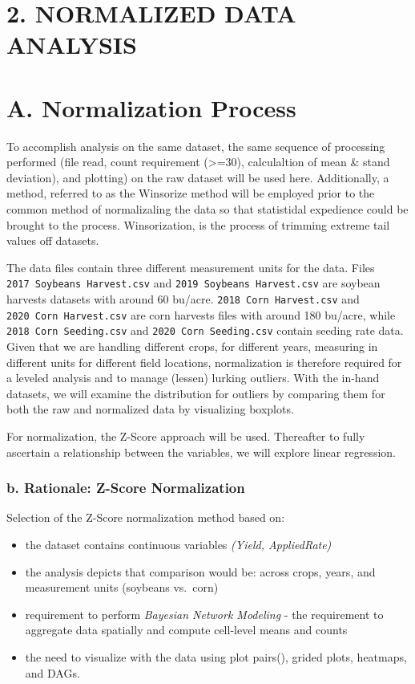 \documentclass[
]{article}
\begin{document}
\section{2. NORMALIZED DATA ANALYSIS}\label{normalized-data-analysis}

\section{A. Normalization Process}\label{a.-normalization-process}

To accomplish analysis on the same dataset, the same sequence of
processing performed (file read, count requirement (\textgreater=30),
calculaltion of mean \& stand deviation), and plotting) on the raw
dataset will be used here. Additionally, a method, referred to as the
Winsorize method will be employed prior to the common method of
normalizaling the data so that statistidal expedience could be brought
to the process. Winsorization, is the process of trimming extreme tail
values off datasets.

The data files contain three different measurement units for the data.
Files \texttt{2017\ Soybeans\ Harvest.csv} and
\texttt{2019\ Soybeans\ Harvest.csv} are soybean harvests datasets with
around 60 bu/acre. \texttt{2018\ Corn\ Harvest.csv} and
\texttt{2020\ Corn\ Harvest.csv} are corn harvests files with around 180
bu/acre, while \texttt{2018\ Corn\ Seeding.csv} and
\texttt{2020\ Corn\ Seeding.csv} contain seeding rate data. Given that
we are handling different crops, for different years, measuring in
different units for different field locations, normalization is
therefore required for a leveled analysis and to manage (lessen) lurking
outliers. With the in-hand datasets, we will examine the distribution
for outliers by comparing them for both the raw and normalized data by
visualizing boxplots.

For normalization, the Z-Score approach will be used. Thereafter to
fully ascertain a relationship between the variables, we will explore
linear regression.

\subsubsection{b. Rationale: Z-Score
Normalization}\label{b.-rationale-z-score-normalization}

Selection of the Z-Score normalization method based on:

\begin{itemize}
\item
  the dataset contains continuous variables \emph{(Yield, AppliedRate)}
\item
  the analysis depicts that comparison would be: across crops, years,
  and measurement units (soybeans vs.~corn)
\item
  requirement to perform \emph{Bayesian Network Modeling} - the
  requirement to aggregate data spatially and compute cell-level means
  and counts
\item
  the need to visualize with the data using plot pairs(), grided plots,
  heatmaps, and DAGs.
\end{itemize}
\end{document}

